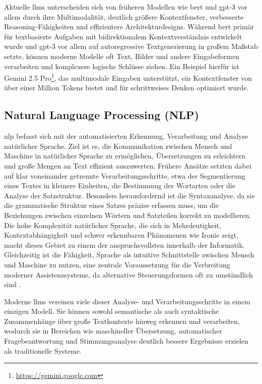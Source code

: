 Aktuelle \glspl{llm} unterscheiden sich von früheren Modellen wie \gls{bert} und \gls{gpt}-3 vor allem durch ihre Multimodalität, deutlich größere Kontextfenster, verbesserte Reasoning-Fähigkeiten und effizientere Architekturdesigns.
Während \gls{bert} primär für textbasierte Aufgaben mit bidirektionalem Kontextverständnis entwickelt wurde und \gls{gpt}-3 vor allem auf autoregressive Textgenerierung in großem Maßstab setzte, können moderne Modelle oft Text, Bilder und andere Eingabeformen verarbeiten und komplexere logische Schlüsse ziehen.
Ein Beispiel hierfür ist Gemini 2.5 Pro\footnote{\url{https://gemini.google.com}}, das multimodale Eingaben unterstützt, ein Kontextfenster von über einer Million Tokens bietet und für schrittweises Denken optimiert wurde.

\subsection{Natural Language Processing (NLP)}

\gls{nlp} befasst sich mit der automatisierten Erkennung, Verarbeitung und Analyse natürlicher Sprache.
Ziel ist es, die Kommunikation zwischen Mensch und Maschine in natürlicher Sprache zu ermöglichen, Übersetzungen zu erleichtern und große Mengen an Text effizient auszuwerten.
Frühere Ansätze setzten dabei auf klar voneinander getrennte Verarbeitungsschritte, etwa der Segmentierung eines Textes in kleinere Einheiten, die Bestimmung der Wortarten oder die Analyse der Satzstruktur.
Besonders herausfordernd ist die Syntaxanalyse, da sie die grammatische Struktur eines Satzes präzise erfassen muss, um die Beziehungen zwischen einzelnen Wörtern und Satzteilen korrekt zu modellieren.
Die hohe Komplexität natürlicher Sprache, die sich in Mehrdeutigkeit, Kontextabhängigkeit und schwer erkennbaren Phänomenen wie Ironie zeigt, macht dieses Gebiet zu einem der anspruchsvollsten innerhalb der Informatik.
Gleichzeitig ist die Fähigkeit, Sprache als intuitive Schnittstelle zwischen Mensch und Maschine zu nutzen, eine zentrale Voraussetzung für die Verbreitung moderner Assistenzsysteme, da alternative Steuerungsformen oft zu umständlich sind \autocite{grigoleit_natural_2019}.

Moderne \glspl{llm} vereinen viele dieser Analyse- und Verarbeitungsschritte in einem einzigen Modell.
Sie können sowohl semantische als auch syntaktische Zusammenhänge über große Textkontexte hinweg erkennen und verarbeiten, wodurch sie in Bereichen wie maschineller Übersetzung, automatischer Fragebeantwortung und Stimmungsanalyse deutlich bessere Ergebnisse erzielen als traditionelle Systeme.

